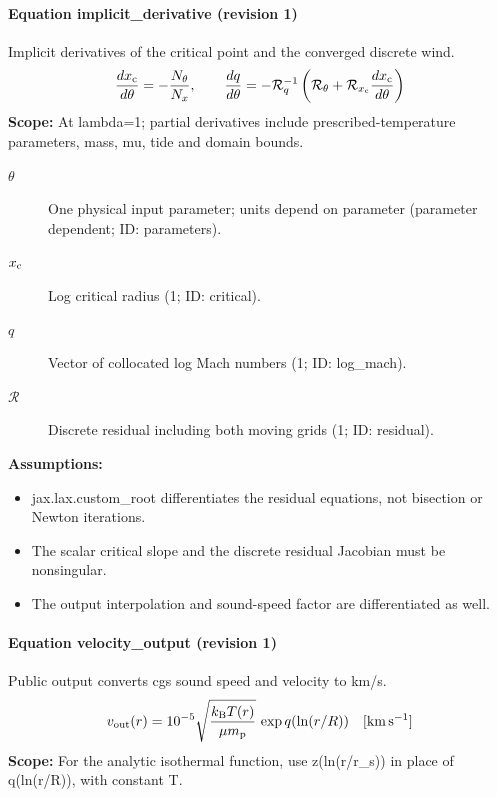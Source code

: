 \paragraph{Equation implicit\_derivative (revision 1)}
Implicit derivatives of the critical point and the converged discrete wind.
\begin{equation}
\begin{aligned}
\frac{dx_{\rm c}}{d\theta}=-\frac{N_\theta}{N_x},\qquad
\frac{dq}{d\theta}=-\mathcal R_q^{-1}\left(\mathcal R_\theta+\mathcal R_{x_{\rm c}}\frac{dx_{\rm c}}{d\theta}\right)
\end{aligned}
\label{eq:escape.parker_5f_wind:implicit_5f_derivative:1}
\end{equation}
\noindent\textbf{Scope:} At lambda=1; partial derivatives include prescribed-temperature parameters, mass, mu, tide and domain bounds.

\begin{description}
\item[$\theta$] One physical input parameter; units depend on parameter (parameter dependent; ID: parameters).
\item[$x_{\rm c}$] Log critical radius (1; ID: critical).
\item[$q$] Vector of collocated log Mach numbers (1; ID: log\_mach).
\item[$\mathcal R$] Discrete residual including both moving grids (1; ID: residual).
\end{description}

\noindent\textbf{Assumptions:}
\begin{itemize}
\item jax.lax.custom\_root differentiates the residual equations, not bisection or Newton iterations.
\item The scalar critical slope and the discrete residual Jacobian must be nonsingular.
\item The output interpolation and sound-speed factor are differentiated as well.
\end{itemize}

\paragraph{Equation velocity\_output (revision 1)}
Public output converts cgs sound speed and velocity to km/s.
\begin{equation}
\begin{aligned}
v_{\rm out}(r)=10^{-5}\sqrt{\frac{k_{\rm B}T(r)}{\mu m_{\rm p}}}\,\exp q(\ln(r/R))\quad[\mathrm{km\,s^{-1}}]
\end{aligned}
\label{eq:escape.parker_5f_wind:velocity_5f_output:1}
\end{equation}
\noindent\textbf{Scope:} For the analytic isothermal function, use z(ln(r/r\_s)) in place of q(ln(r/R)), with constant T.

